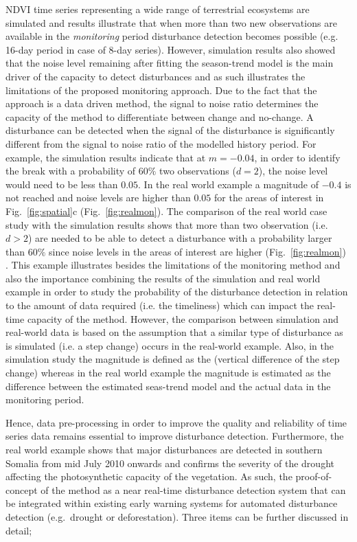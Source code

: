 \documentclass[authoryear,preprint,review,10pt]{elsarticle}
\begin{document}
NDVI time series representing a wide range of terrestrial ecosystems are simulated and results illustrate that when more than two new observations are available in the \emph{monitoring} period disturbance detection becomes possible (e.g. 16-day period in case of 8-day series). However, simulation results also showed that the noise level remaining after fitting the season-trend model is the main driver of the capacity to detect disturbances and as such illustrates the limitations of the proposed monitoring approach. Due to the fact that the approach is a data driven method, the signal to noise ratio determines the capacity of the method to differentiate between change and no-change. A disturbance can be detected when the signal of the disturbance is significantly different from the signal to noise ratio of the modelled history period. For example, the simulation results indicate that at $m = -0.04$, in order to identify the break with a probability of $60\%$ two observations ($d=2$), the noise level would need to be less than $0.05$. In the real world example a magnitude of $-0.4$ is not reached and noise levels are higher than $0.05$ for the areas of interest in Fig.~\ref{fig:spatial}c (Fig.~\ref{fig:realmon}). The comparison of the real world case study with the simulation results shows that more than two observation (i.e. $d>2$) are needed to be able to detect a disturbance with a probability larger than $60\%$ since noise levels in the areas of interest are higher (Fig.~\ref{fig:realmon}) . This example illustrates besides the limitations of the monitoring method and also the importance combining the results of the simulation and real world example in order to study the probability of the disturbance detection in relation to the amount of data required (i.e. the timeliness) which can impact the real-time capacity of the method. However, the comparison between simulation and real-world data is based on the assumption that a similar type of disturbance as is simulated (i.e. a step change) occurs in the real-world example. Also, in the simulation study the magnitude is defined as the (vertical difference of the step change) whereas in the real world example the magnitude is estimated as the difference between the estimated seas-trend model and the actual data in the monitoring period. 

Hence, data pre-processing in order to improve the quality and reliability of time series data remains essential to improve disturbance detection. Furthermore, the real world example shows that major disturbances are detected in southern Somalia from mid July 2010 onwards and confirms the severity of the drought affecting the photosynthetic capacity of the vegetation. As such, the proof-of-concept of the method as a near real-time disturbance detection system that can be integrated within existing early warning systems for automated disturbance detection (e.g.\ drought or deforestation). Three items can be further discussed in detail;
\end{document}
